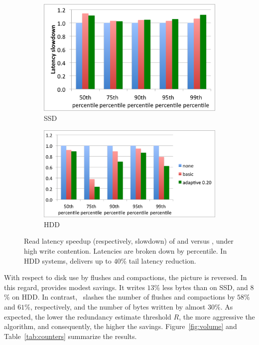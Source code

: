 \begin{figure}[t]
  \centering
  
  \begin{subfigure}[t]{.9\columnwidth}
      \includegraphics[width=\figw]{Figs/latency-ssd.png}
      \caption[]{SSD}
    \label{fig:latency:ssd}
  \end{subfigure}
  \begin{subfigure}[t]{1.1\columnwidth}
      \includegraphics[width=\figw]{Figs/latency-hdd.png}
      \caption[]{HDD}
    \label{fig:latency:hdd}
  \end{subfigure}

  \caption{Read latency speedup (respectively, slowdown) of \basic\/ and \adp\/ versus \none, under high write contention.
  Latencies are broken down by percentile. In HDD systems, \adp\/ delivers up to $40$\% tail latency reduction. 
  }
  
  \label{fig:latency}
\end{figure}

With respect to disk use by flushes and compactions, the picture is reversed. In this regard, 
\basic\/ provides modest savings. It writes $13$\% less bytes than \none\/ on SSD, and $8$\% 
on HDD. In contrast, \adp\ slashes the number of flushes and compactions by $58\%$ and $61$\%, 
respectively, and the number of bytes written by almost $30\%$. As expected, the lower the 
redundancy estimate threshold $R$, the more aggressive the algorithm, and consequently, 
the higher the savings. Figure~\ref{fig:volume} and Table~\ref{tab:counters} summarize the results. 

